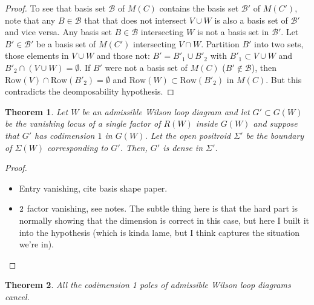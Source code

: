 \documentclass[11pt]{article}
\newcommand{\cB}{\mathcal{B}}
\newcommand{\Rows}{\textrm{Row}}
\newtheorem{thm}{Theorem}[section]
\theoremstyle{remark}
\theoremstyle{definition}
\begin{document}
\begin{proof}
To see that basis set $\cB$ of $M(C)$ contains the basis set $\cB'$ of $M(C')$, note that any $B \in \cB$ that that does not intersect $V \cup W$ is also a basis set of $\cB'$ and vice versa. Any basis set $B \in \cB$ intersecting $W$ is not a basis set in $\cB'$. Let $B' \in \cB'$ be a basis set of $M(C')$ intersecting $V\cap W$. Partition $B'$ into two sets, those elements in $V \cup W$  and those not: $B' = B'_1 \cup B'_2$ with $B'_1 \subset V \cup W$ and $B'_2 \cap (V \cup W) = \emptyset$. If $B'$ were not a basis set of $M(C)$ ($B' \not \in \cB$), then $\Rows(V) \cap \Rows(B'_2) = \emptyset$ and $\Rows(W) \subset \Rows(B'_2)$ in $M(C)$. But this contradicts the deomposability hypothesis.
\end{proof}


\begin{thm}
Let $W$ be an admissible Wilson loop diagram and let $G' \subset G(W)$ be the vanishing locus of a single factor of $R(W)$ inside $G(W)$ and suppose that $G'$ has codimension $1$ in $G(W)$. Let the open positroid $\Sigma'$ be the boundary of $\Sigma(W)$ corresponding to $G'$. Then, $G'$ is dense in $\Sigma'$.
\end{thm}

\begin{proof}
\begin{itemize}
\item Entry vanishing, cite basis shape paper.
\item $2 \time 2$ factor vanishing, see notes. The subtle thing here is that the hard part is normally showing that the dimension is correct in this case, but here I built it into the hypothesis (which is kinda lame, but I think captures the situation we're in).
\end{itemize}
\end{proof}

\begin{thm}
All the codimension 1 poles of admissible Wilson loop diagrams cancel.
\end{thm}
\end{document}
